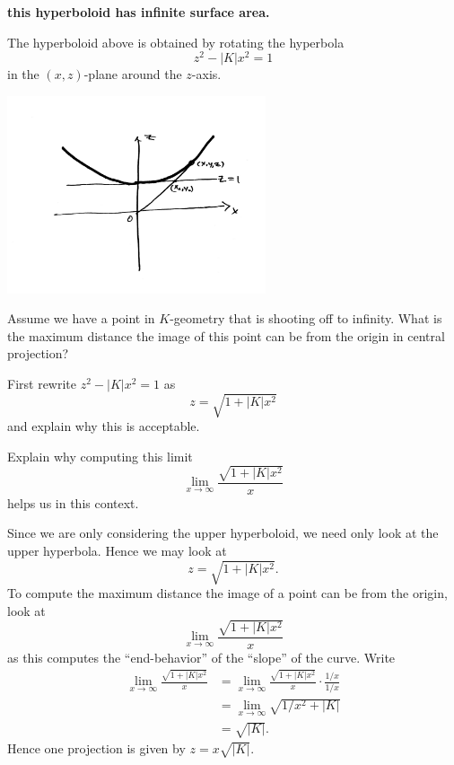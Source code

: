 \documentclass{ximera}
\begin{document}
\begin{center}
  \textbf{this hyperboloid has infinite surface area.}
\end{center}

The hyperboloid above is obtained by rotating the hyperbola
\[
z^{2}-\left\vert K\right\vert x^{2}= 1
\]
in the $(x,z)$-plane around the $z$-axis.
\begin{image}
\includegraphics[width=3in]{UpperHyperbola.png}
\end{image}


\begin{problem}
  Assume we have a point in $K$-geometry that is shooting off to
  infinity. What is the maximum distance the image of this point can
  be from the origin in central projection?
  \begin{hint}
    First rewrite $z^{2}-|K|x^{2} =1$ as
    \[
    z = \sqrt{1+|K|x^2}
    \]
    and explain why this is acceptable.
  \end{hint}
  \begin{hint}
    Explain why computing this limit
    \[
    \lim_{x\to \infty} \frac{\sqrt{1+|K|x^2}}{x}
    \]
    helps us in this context.
  \end{hint}
  \begin{freeResponse}
    Since we are only considering the upper hyperboloid, we need only
    look at the upper hyperbola. Hence we may look at
     \[
    z = \sqrt{1+|K|x^2}.
    \]
    To compute the maximum distance the image of a point can be from
    the origin, look at 
    \[
    \lim_{x\to \infty} \frac{\sqrt{1+|K|x^2}}{x}
    \]
    as this computes the ``end-behavior'' of the ``slope'' of the
    curve. Write
    \begin{align*}
      \lim_{x\to \infty} \frac{\sqrt{1+|K|x^2}}{x} &= \lim_{x\to \infty} \frac{\sqrt{1+|K|x^2}}{x}\cdot \frac{1/x}{1/x}\\
      &= \lim_{x\to \infty} \sqrt{1/x^2+|K|}\\
      &= \sqrt{|K|}.
    \end{align*}
    Hence one projection is given by $z = x\sqrt{|K|}$.
  \end{freeResponse}
\end{problem}
\end{document}
